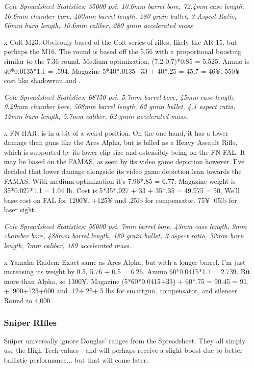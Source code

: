 \begin{multicols*}{2}
	\textit{\textcolor{OliveGreen}{Cole Spreadsheet Statistics: 35000 psi, 10.6mm barrel bore, 72.4mm case length, 10.6mm chamber bore, 400mm barrel length, 280 grain bullet, 3 Aspect Ratio, 60mm burn length, 10.6mm caliber, 280 grain accelerated mass}}
	
	x Colt M23: Obvisouly based of the Colt series of rifles, likely the AR-15, but perhaps the M16. The round is based off the 5.56 with a proportional boosting similar to the 7.36 round. Medium optimization, (7.2-0.7)*0.85 = 5.525. Ammo is 40*0.0135*1.1 = .594. Magazine 5*40*.0135+33 + 40*.25 = 45.7 = 46¥. 550¥ cost like shadowrun and \GURPS.
	
	\textit{\textcolor{OliveGreen}{Cole Spreadsheet Statistics: 68750 psi, 5.7mm barrel bore, 45mm case length, 9.29mm chamber bore, 508mm barrel length, 62 grain bullet, 4.1 aspect ratio, 12mm burn length, 5.7mm caliber, 62 grain accelerated mass.}}
	
	x FN HAR: is in a bit of a weird position. On the one hand, it has a lower damage than guns like the Ares Alpha, but is billed as a Heavy Assault Rifle, which is supported by its lower clip size and ostensibly being on the FN FAL. It may be based on the FAMAS, as seen by its video game depiction however. I've decided that lower damage alongside its video game depiction lean towards the FAMAS. With medium optimization it's 7.96*.85 = 6.77.  Magazine weight is  35*0.027*1.1 = 1.04 lb. Cost is 5*35*.027 + 33 + 35*.35 = 49.975 = 50. We'll base cost on FAL for 1200¥. +125¥ and .25lb for compensator. 75¥ .05lb for laser sight.
	
	\textit{\textcolor{OliveGreen}{Cole Spreadsheet Statistics:  56000 psi, 7mm barrel bore, 43mm case length, 9mm chamber bore, 488mm barrel length, 189 grain bullet, 3 aspect ratio, 32mm burn length, 7mm caliber, 189 accelerated mass.}}
	
	x Yamaha Raiden: Exact same as Ares Alpha, but with a longer barrel. I'm just increasing its weight by 0.5, 5.76 + 0.5 = 6.26. Ammo 60*0.0415*1.1 = 2.739. Bit more than Alpha, so 1300¥. Magazine (5*60*0.0415+33) + 60*.75 = 90.45 = 91. +1900+125+600 and .12+.25+.5 lbs for smartgun, compensator, and silencer. Round to 4,000
	
	\subsubsection{Sniper RIfles}
	
	Sniper universally ignore Douglas' ranges from the Spreadsheet. They all simply use the High Tech values - and will perhaps receive a slight boost due to better ballistic performance... but that will come later.
	

\end{multicols*}
